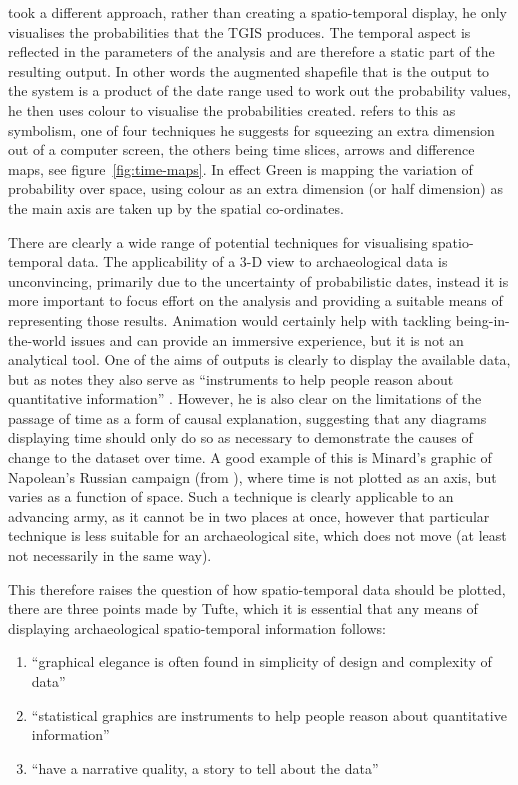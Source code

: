 \citet{Green:2008fk} took a different approach, rather than creating a spatio-temporal display, he only visualises the probabilities that the TGIS produces. The temporal aspect is reflected in the parameters of the analysis and are therefore a static part of the resulting output. In other words the augmented shapefile that is the output to the system is a product of the date range used to work out the probability values, he then uses colour to visualise the probabilities created. \citet{Johnson:1999cr} refers to this as symbolism, one of four techniques he suggests for squeezing an extra dimension out of a computer screen, the others being time slices, arrows and difference maps, see figure~\ref{fig:time-maps}. In effect Green is mapping the variation of probability over space, using colour as an extra dimension (or half dimension) as the main axis are taken up by the spatial co-ordinates.

There are clearly a wide range of potential techniques for visualising spatio-temporal data. The applicability of a 3-D view to archaeological data is unconvincing, primarily due to the uncertainty of probabilistic dates, instead it is more important to focus effort on the analysis and providing a suitable means of representing those results. Animation would certainly help with tackling being-in-the-world issues and can provide an immersive experience, but it is not an analytical tool. One of the aims of outputs is clearly to display the available data, but as \citet{tufte1983visual} notes they also serve as ``instruments to help people reason about quantitative information'' \citep[91]{tufte1983visual}. However, he is also clear on the limitations of the passage of time as a form of causal explanation, \citep[37]{tufte1983visual} suggesting that any diagrams displaying time should only do so as necessary to demonstrate the causes of change to the dataset over time. A good example of this is Minard's graphic of Napolean's Russian campaign (from \citealp[41]{tufte1983visual}), where time is not plotted as an axis, but varies as a function of space. Such a technique is clearly applicable to an advancing army, as it cannot be in two places at once, however that particular technique is less suitable for an archaeological site, which does not move (at least not necessarily in the same way). 

This therefore raises the question of how spatio-temporal data should be plotted, there are three points made by Tufte, which it is essential that any means of displaying archaeological spatio-temporal information follows:
\begin{enumerate}
\item ``graphical elegance is often found in simplicity of design and complexity of data'' \citep[177]{tufte1983visual}
\item ``statistical graphics are instruments to help people reason about quantitative information'' \citep[91]{tufte1983visual}
\item ``have a narrative quality, a story to tell about the data''  \citep[177]{tufte1983visual}
\end{enumerate} 


